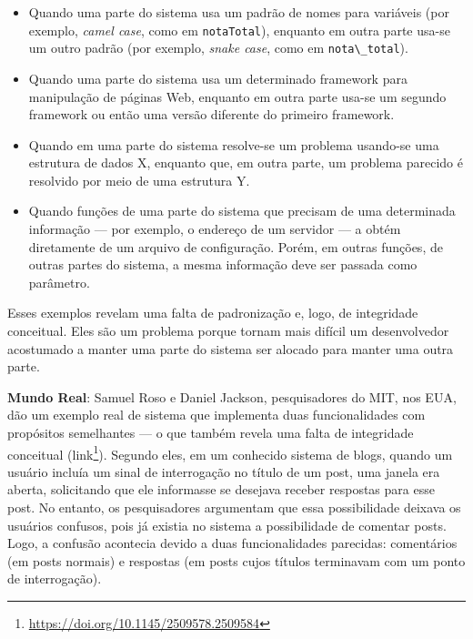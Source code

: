 \documentclass[
  11pt,
  twoside]{book}
\newcommand{\passthrough}[1]{#1}
\DeclareRobustCommand{\href}[2]{#2\footnote{\url{#1}}}
\newenvironment{esmbox}{\centering \vspace{1.5ex} \begin{tcolorbox}[breakable, colback=backcolor, width=4.9in]}{\end{tcolorbox} \vspace{1.5ex}}
\begin{document}
\begin{itemize}
\item
  Quando uma parte do sistema usa um padrão de nomes para variáveis (por
  exemplo, \emph{camel case}, como em
  \passthrough{\lstinline!notaTotal!}), enquanto em outra parte usa-se
  um outro padrão (por exemplo, \emph{snake case}, como em
  \passthrough{\lstinline!nota\_total!}).
\item
  Quando uma parte do sistema usa um determinado framework para
  manipulação de páginas Web, enquanto em outra parte usa-se um segundo
  framework ou então uma versão diferente do primeiro framework.
\item
  Quando em uma parte do sistema resolve-se um problema usando-se uma
  estrutura de dados X, enquanto que, em outra parte, um problema
  parecido é resolvido por meio de uma estrutura Y.
\item
  Quando funções de uma parte do sistema que precisam de uma determinada
  informação --- por exemplo, o endereço de um servidor --- a obtém
  diretamente de um arquivo de configuração. Porém, em outras funções,
  de outras partes do sistema, a mesma informação deve ser passada como
  parâmetro.
\end{itemize}

Esses exemplos revelam uma falta de padronização e, logo, de integridade
conceitual. Eles são um problema porque tornam mais difícil um
desenvolvedor acostumado a manter uma parte do sistema ser alocado para
manter uma outra parte.

\begin{esmbox} 

\textbf{Mundo Real}: Samuel Roso e Daniel Jackson, pesquisadores do MIT,
nos EUA, dão um exemplo real de sistema que implementa duas
funcionalidades com propósitos semelhantes --- o que também revela uma
falta de integridade conceitual
(\href{https://doi.org/10.1145/2509578.2509584}{link}). Segundo eles, em
um conhecido sistema de blogs, quando um usuário incluía um sinal de
interrogação no título de um post, uma janela era aberta, solicitando
que ele informasse se desejava receber respostas para esse post. No
entanto, os pesquisadores argumentam que essa possibilidade deixava os
usuários confusos, pois já existia no sistema a possibilidade de
comentar posts. Logo, a confusão acontecia devido a duas funcionalidades
parecidas: comentários (em posts normais) e respostas (em posts cujos
títulos terminavam com um ponto de interrogação).

\end{esmbox} 
\end{document}
